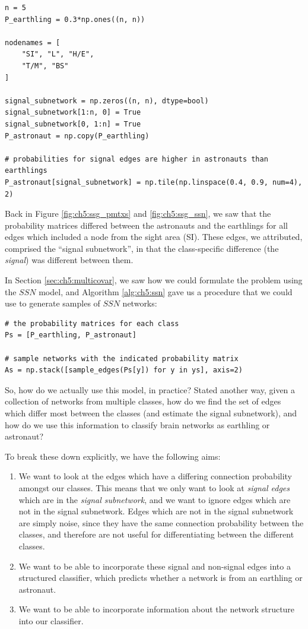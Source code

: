 \begin{lstlisting}[style=python]
n = 5
P_earthling = 0.3*np.ones((n, n))

nodenames = [
    "SI", "L", "H/E", 
    "T/M", "BS"
]

signal_subnetwork = np.zeros((n, n), dtype=bool)
signal_subnetwork[1:n, 0] = True
signal_subnetwork[0, 1:n] = True
P_astronaut = np.copy(P_earthling)

# probabilities for signal edges are higher in astronauts than earthlings
P_astronaut[signal_subnetwork] = np.tile(np.linspace(0.4, 0.9, num=4), 2)
\end{lstlisting}

Back in Figure \ref{fig:ch5:ssg_pmtxs} and \ref{fig:ch5:ssg_ssn}, we saw that the probability matrices differed between the astronauts and the earthlings for all edges which included a node from the sight area (SI). These edges, we attributed, comprised the ``signal subnetwork'', in that the class-specific difference (the \textit{signal}) was different between them.

In Section \ref{sec:ch5:multicovar}, we saw how we could formulate the problem using the $SSN$ model, and Algorithm \ref{alg:ch5:ssn} gave us a procedure that we could use to generate samples of $SSN$ networks:


\begin{lstlisting}[style=python]
# the probability matrices for each class
Ps = [P_earthling, P_astronaut]

# sample networks with the indicated probability matrix
As = np.stack([sample_edges(Ps[y]) for y in ys], axis=2)
\end{lstlisting}

So, how do we actually use this model, in practice? Stated another way, given a collection of networks from multiple classes, how do we find the set of edges which differ most between the classes (and estimate the signal subnetwork), and how do we use this information to classify brain networks as earthling or astronaut?

To break these down explicitly, we have the following aims:

\begin{enumerate}
    \item We want to look at the edges which have a differing connection probability amongst our classes. This means that we only want to look at \textit{signal edges} which are in the \textit{signal subnetwork}, and we want to ignore edges which are not in the signal subnetwork. Edges which are not in the signal subnetwork are simply noise, since they have the same connection probability between the classes, and therefore are not useful for differentiating between the different classes.
    \item We want to be able to incorporate these signal and non-signal edges into a structured classifier, which predicts whether a network is from an earthling or astronaut.
    \item We want to be able to incorporate information about the network structure into our classifier.
\end{enumerate}

